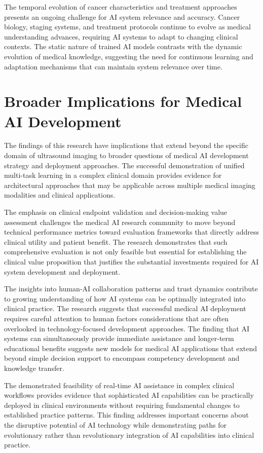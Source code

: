 The temporal evolution of cancer characteristics and treatment approaches presents an ongoing challenge for AI system relevance and accuracy. Cancer biology, staging systems, and treatment protocols continue to evolve as medical understanding advances, requiring AI systems to adapt to changing clinical contexts. The static nature of trained AI models contrasts with the dynamic evolution of medical knowledge, suggesting the need for continuous learning and adaptation mechanisms that can maintain system relevance over time.

\section{Broader Implications for Medical AI Development}

The findings of this research have implications that extend beyond the specific domain of ultrasound imaging to broader questions of medical AI development strategy and deployment approaches. The successful demonstration of unified multi-task learning in a complex clinical domain provides evidence for architectural approaches that may be applicable across multiple medical imaging modalities and clinical applications.

The emphasis on clinical endpoint validation and decision-making value assessment challenges the medical AI research community to move beyond technical performance metrics toward evaluation frameworks that directly address clinical utility and patient benefit. The research demonstrates that such comprehensive evaluation is not only feasible but essential for establishing the clinical value proposition that justifies the substantial investments required for AI system development and deployment.

The insights into human-AI collaboration patterns and trust dynamics contribute to growing understanding of how AI systems can be optimally integrated into clinical practice. The research suggests that successful medical AI deployment requires careful attention to human factors considerations that are often overlooked in technology-focused development approaches. The finding that AI systems can simultaneously provide immediate assistance and longer-term educational benefits suggests new models for medical AI applications that extend beyond simple decision support to encompass competency development and knowledge transfer.

The demonstrated feasibility of real-time AI assistance in complex clinical workflows provides evidence that sophisticated AI capabilities can be practically deployed in clinical environments without requiring fundamental changes to established practice patterns. This finding addresses important concerns about the disruptive potential of AI technology while demonstrating paths for evolutionary rather than revolutionary integration of AI capabilities into clinical practice.


